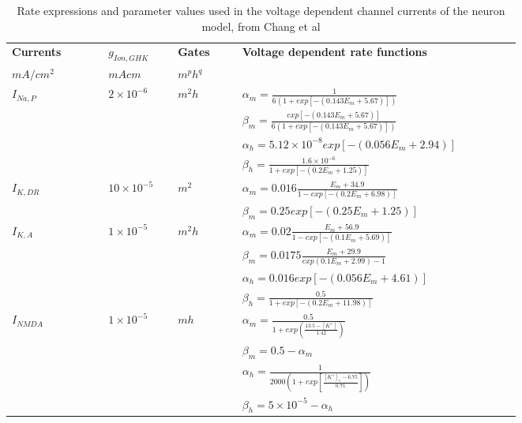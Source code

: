 \documentclass[fleqn]{report}
\numberwithin{equation}{section}
\numberwithin{equation}{section}
\begin{document}
				            \begin{table*}[h!]
				            				\centering
				            				\caption{Rate expressions and parameter values used in the voltage dependent channel currents of the neuron model, from Chang et al\citep{Chang2013}}
				            				\begin{tabular}{| p{0.15\linewidth} | >{\footnotesize} p{0.1\linewidth} | >{\footnotesize} p{0.1\linewidth} | >{\footnotesize} p{0.4\linewidth} |}
				            				\hline
				            				
				            				\bf Currents 		& \bf $g_{Ion,GHK} $  & \bf Gates     & \bf Voltage dependent rate functions  \\
				            				$mA/cm^2$&$ mA cm $&$m^ph^q$& \\
				            				\hline
				            				
				            				$I_{Na,P}$			& $2\times10^{-6}$ & $m^2h$ & $\alpha_m=\frac{1}{6(1+exp[-(0.143E_m+5.67)])}$  \\ 
				            				&&& $\beta_m=\frac{exp[-(0.143E_m+5.67)]}{6(1+exp[-(0.143E_m+5.67)])}$\\
				            				
				            				&&& $\alpha_h=5.12\times10^{-8}exp[-(0.056E_m+2.94)] $\\
				            				
				            				&&& $\beta_h=\frac{1.6\times10^{-6}}{1+exp[-(0.2E_m+1.25)]}$\\
				            				
				            				\hline
				            				$I_{K,DR}$			& $10\times10^{-5}$ & $m^2$ & $\alpha_m=0.016\frac{E_m+34.9}{1-exp[-(0.2E_m+6.98)]}$  \\ 
				            				&&& $\beta_m=0.25exp[-(0.25E_m+1.25)]$  \\
				            				\hline
				            				$I_{K,A}$			& $1\times10^{-5}$ & $m^2h$ & $\alpha_m=0.02\frac{E_m+56.9}{1-exp[-(0.1E_m+5.69)]}$  \\ 
				            				&&& $\beta_m=0.0175\frac{E_m+29.9}{exp(0.1E_m+2.99)-1}$\\
				            				&&& $\alpha_h=0.016exp[-(0.056E_m+4.61)] $\\
				            				&&& $\beta_h=\frac{0.5}{1+exp[-(0.2E_m+11.98)]}$\\
				            				\hline
				            				$I_{NMDA}$			& $1\times10^{-5}$ & $mh$ & $\alpha_m=\frac{0.5}{1+exp\left(\frac{13.5-[K^+]}{1.42}\right)}$  \\ 
				            				&&& $\beta_m=0.5-\alpha_m$\\
				            				&&& $ \alpha_h=\frac{1}{2000\left(1+exp\left[\frac{[K^+]_e-6.75}{0.71}\right]\right)} $\\
				            				&&& $\beta_h=5\times10^{-5}-\alpha_h$\\
				            				\hline
				            				\end{tabular}
				            				\end{table*}
				
\end{document}
